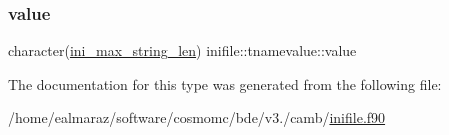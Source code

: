 \mbox{\label{structinifile_1_1tnamevalue_ac027d2bf9ce0ee563af502d89d239e56}} 
\subsubsection{\texorpdfstring{value}{value}}
{\footnotesize\ttfamily character(\mbox{\hyperlink{namespaceinifile_a32faebf83b580d14b5af965dcb4eebfd}{ini\+\_\+max\+\_\+string\+\_\+len}}) inifile\+::tnamevalue\+::value}



The documentation for this type was generated from the following file\+:\begin{DoxyCompactItemize}
\item 
/home/ealmaraz/software/cosmomc/bde/v3./camb/\mbox{\hyperlink{inifile_8f90}{inifile.\+f90}}\end{DoxyCompactItemize}
